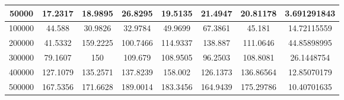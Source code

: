\documentclass{article}
\begin{document}
\begin{table}[]
\begin{tabular}{|c|c|c|c|c|c|c|c| }
                50000	&17.2317	&18.9895	&26.8295	&19.5135	&21.4947	&20.81178&	3.691291843\\ \hline
                100000	&44.588	&30.9826	&32.9784	&49.9699	&67.3861	&45.181	&14.72115559\\ \hline
                200000	&41.5332	&159.2225	&100.7466	&114.9337	&138.887	&111.0646	&44.85898995\\ \hline
                300000	&79.1607	&150	&109.679	&108.9505	&96.2503	&108.8081	&26.1448754\\ \hline
                400000	&127.1079	&135.2571&	137.8239	&158.002&	126.1373&	136.86564	&12.85070179\\ \hline
                500000	&167.5356	&171.6628&	189.0014	&183.3456	&164.9439	&175.29786&	10.40701635\\ \hline
        \end{tabular}
    \end{table}
\end{document}
